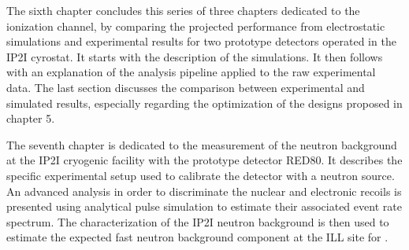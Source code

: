 The sixth chapter concludes this series of three chapters dedicated to the ionization channel, by comparing the projected performance from electrostatic simulations and experimental results for two prototype detectors operated in the IP2I cyrostat. It starts with the description of the simulations. It then follows with an explanation of the analysis pipeline applied to the raw experimental data. The last section discusses the comparison between experimental and simulated results, especially regarding the optimization of the designs proposed in chapter 5.

The seventh chapter is dedicated to the measurement of the neutron background at the IP2I cryogenic facility with the prototype detector RED80. It describes the specific experimental setup used to calibrate the detector with a neutron source. An advanced analysis in order to discriminate the nuclear and electronic recoils is presented using analytical pulse simulation to estimate their associated event rate spectrum. The characterization of the IP2I neutron background is then used to estimate the expected fast neutron background component at the ILL site for \Ricochet{}.






